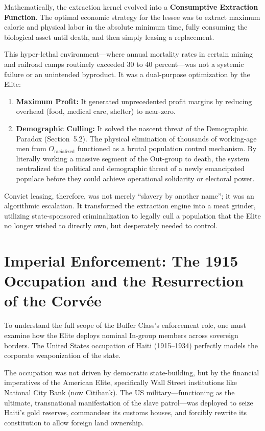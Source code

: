 \documentclass[12pt,openany]{book}
\begin{document}
Mathematically, the extraction kernel evolved into a \textbf{Consumptive Extraction Function}. The optimal economic strategy for the lessee was to extract maximum caloric and physical labor in the absolute minimum time, fully consuming the biological asset until death, and then simply leasing a replacement.

This hyper-lethal environment---where annual mortality rates in certain mining and railroad camps routinely exceeded 30 to 40 percent---was not a systemic failure or an unintended byproduct. It was a dual-purpose optimization by the Elite:

\begin{enumerate}
    \item \textbf{Maximum Profit:} It generated unprecedented profit margins by reducing overhead (food, medical care, shelter) to near-zero.

    \item \textbf{Demographic Culling:} It solved the nascent threat of the Demographic Paradox (Section~5.2). The physical elimination of thousands of working-age men from $O_{\text{racialized}}$ functioned as a brutal population control mechanism. By literally working a massive segment of the Out-group to death, the system neutralized the political and demographic threat of a newly emancipated populace before they could achieve operational solidarity or electoral power.
\end{enumerate}

Convict leasing, therefore, was not merely ``slavery by another name''; it was an algorithmic escalation. It transformed the extraction engine into a meat grinder, utilizing state-sponsored criminalization to legally cull a population that the Elite no longer wished to directly own, but desperately needed to control.

\section{Imperial Enforcement: The 1915 Occupation and the Resurrection of the Corv\'{e}e}

To understand the full scope of the Buffer Class's enforcement role, one must examine how the Elite deploys nominal In-group members across sovereign borders. The United States occupation of Haiti (1915–1934) perfectly models the corporate weaponization of the state.

The occupation was not driven by democratic state-building, but by the financial imperatives of the American Elite, specifically Wall Street institutions like National City Bank (now Citibank). The US military—functioning as the ultimate, transnational manifestation of the slave patrol—was deployed to seize Haiti's gold reserves, commandeer its customs houses, and forcibly rewrite its constitution to allow foreign land ownership.
\end{document}
